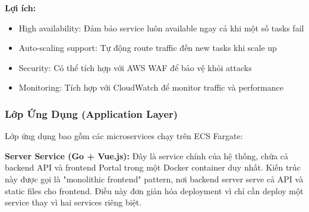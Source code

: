 \textbf{Lợi ích:}
\begin{itemize}
    \item High availability: Đảm bảo service luôn available ngay cả khi một số tasks fail
    \item Auto-scaling support: Tự động route traffic đến new tasks khi scale up
    \item Security: Có thể tích hợp với AWS WAF để bảo vệ khỏi attacks
    \item Monitoring: Tích hợp với CloudWatch để monitor traffic và performance
\end{itemize}

\subsubsection{Lớp Ứng Dụng (Application Layer)}

Lớp ứng dụng bao gồm các microservices chạy trên ECS Fargate:

\textbf{Server Service (Go + Vue.js):} Đây là service chính của hệ thống, chứa cả backend API và frontend Portal trong một Docker container duy nhất. Kiến trúc này được gọi là "monolithic frontend" pattern, nơi backend server serve cả API và static files cho frontend. Điều này đơn giản hóa deployment vì chỉ cần deploy một service thay vì hai services riêng biệt.

